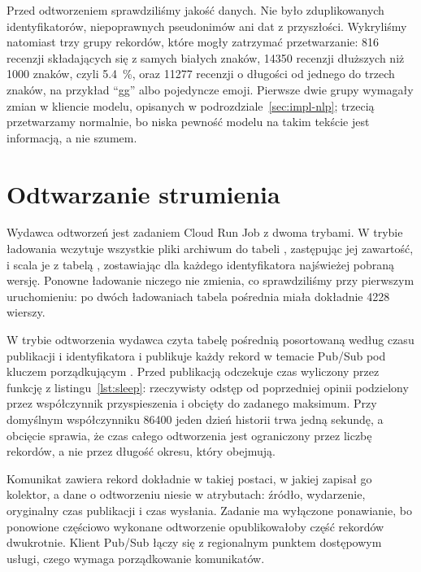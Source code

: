 Przed odtworzeniem sprawdziliśmy jakość danych.
Nie było zduplikowanych identyfikatorów, niepoprawnych pseudonimów ani dat z przyszłości.
Wykryliśmy natomiast trzy grupy rekordów, które mogły zatrzymać przetwarzanie: 816 recenzji składających się z samych białych znaków, \num{14350} recenzji dłuższych niż \num{1000} znaków, czyli \qty{5.4}{\percent}, oraz \num{11277} recenzji o długości od jednego do trzech znaków, na przykład \enquote{gg} albo pojedyncze emoji.
Pierwsze dwie grupy wymagały zmian w kliencie modelu, opisanych w podrozdziale~\ref{sec:impl-nlp}; trzecią przetwarzamy normalnie, bo niska pewność modelu na takim tekście jest informacją, a nie szumem.

\section{Odtwarzanie strumienia}
\label{sec:impl-replay}

Wydawca odtworzeń jest zadaniem Cloud Run Job z dwoma trybami.
W trybie ładowania wczytuje wszystkie pliki archiwum do tabeli , zastępując jej zawartość, i scala je z tabelą , zostawiając dla każdego identyfikatora najświeżej pobraną wersję.
Ponowne ładowanie niczego nie zmienia, co sprawdziliśmy przy pierwszym uruchomieniu: po dwóch ładowaniach tabela pośrednia miała dokładnie \num{4228} wierszy.

W trybie odtworzenia wydawca czyta tabelę pośrednią posortowaną według czasu publikacji i identyfikatora i publikuje każdy rekord w temacie Pub/Sub pod kluczem porządkującym .
Przed publikacją odczekuje czas wyliczony przez funkcję z listingu~\ref{lst:sleep}: rzeczywisty odstęp od poprzedniej opinii podzielony przez współczynnik przyspieszenia i obcięty do zadanego maksimum.
Przy domyślnym współczynniku \num{86400} jeden dzień historii trwa jedną sekundę, a obcięcie sprawia, że czas całego odtworzenia jest ograniczony przez liczbę rekordów, a nie przez długość okresu, który obejmują.



Komunikat zawiera rekord dokładnie w takiej postaci, w jakiej zapisał go kolektor, a dane o odtworzeniu niesie w atrybutach: źródło, wydarzenie, oryginalny czas publikacji i czas wysłania.
Zadanie ma wyłączone ponawianie, bo ponowione częściowo wykonane odtworzenie opublikowałoby część rekordów dwukrotnie.
Klient Pub/Sub łączy się z regionalnym punktem dostępowym usługi, czego wymaga porządkowanie komunikatów.

